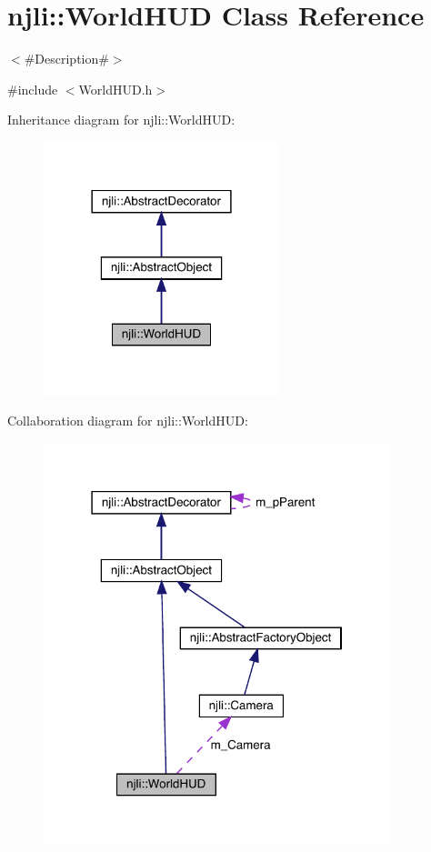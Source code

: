 \hypertarget{classnjli_1_1_world_h_u_d}{}\section{njli\+:\+:World\+H\+UD Class Reference}
\label{classnjli_1_1_world_h_u_d}


$<$\#\+Description\#$>$  




{\ttfamily \#include $<$World\+H\+U\+D.\+h$>$}



Inheritance diagram for njli\+:\+:World\+H\+UD\+:\nopagebreak
\begin{figure}[H]
\begin{center}
\leavevmode
\includegraphics[width=194pt]{classnjli_1_1_world_h_u_d__inherit__graph}
\end{center}
\end{figure}


Collaboration diagram for njli\+:\+:World\+H\+UD\+:\nopagebreak
\begin{figure}[H]
\begin{center}
\leavevmode
\includegraphics[width=286pt]{classnjli_1_1_world_h_u_d__coll__graph}
\end{center}
\end{figure}
